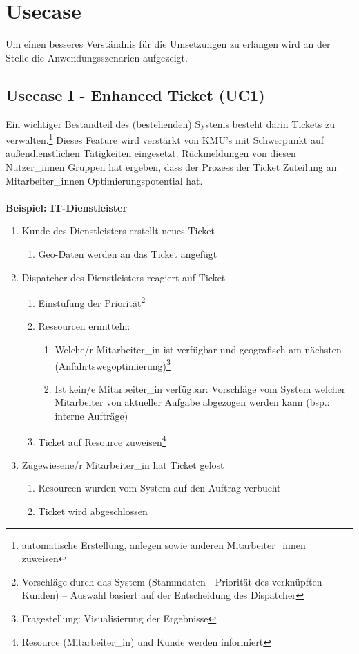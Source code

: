 \documentclass[Bachelorarbeit.tex]{subfiles}
\begin{document}
\section{Usecase}

Um einen besseres Verständnis für die Umsetzungen zu erlangen wird an der Stelle die Anwendungsszenarien aufgezeigt.



\subsection{Usecase I - Enhanced Ticket (\ac{UC}1)}
Ein wichtiger Bestandteil des (bestehenden) Systems besteht darin Tickets zu verwalten.\footnote{automatische Erstellung, anlegen sowie anderen Mitarbeiter\_innen zuweisen}
Dieses Feature wird verstärkt von \ac{KMU}’s mit Schwerpunkt auf außendienstlichen Tätigkeiten eingesetzt. 
Rückmeldungen von diesen Nutzer\_innen Gruppen hat ergeben, dass der Prozess der Ticket Zuteilung an Mitarbeiter\_innen Optimierungspotential hat. \\
\\

\textbf{Beispiel: IT-Dienstleister}
\begin{enumerate}
	\item Kunde des Dienstleisters erstellt neues Ticket
		\begin{enumerate}
			\item Geo-Daten werden an das Ticket angefügt
		\end{enumerate}
	\item Dispatcher des Dienstleisters reagiert auf Ticket
		\begin{enumerate}
			\item Einstufung der Priorität\footnote{Vorschläge durch das System (Stammdaten - Priorität des verknüpften Kunden) – Auswahl basiert auf der Entscheidung des Dispatcher}
			\item Ressourcen ermitteln:
			\begin{enumerate}
				\item Welche/r Mitarbeiter\_in ist verfügbar und geografisch am nächsten (Anfahrtswegoptimierung)\footnote{Fragestellung: Visualisierung der Ergebnisse }
				\item Ist kein/e Mitarbeiter\_in verfügbar: Vorschläge vom System welcher Mitarbeiter von aktueller Aufgabe abgezogen werden kann (bsp.: interne Aufträge)
			\end{enumerate}
			\item Ticket auf Resource zuweisen\footnote{Resource (Mitarbeiter\_in) und Kunde werden informiert}
		\end{enumerate}
	\item Zugewiesene/r Mitarbeiter\_in hat Ticket gelöst
	\begin{enumerate}
		\item Resourcen wurden vom System auf den Auftrag verbucht
		\item Ticket wird abgeschlossen
	\end{enumerate}
\end{enumerate}
\end{document}
